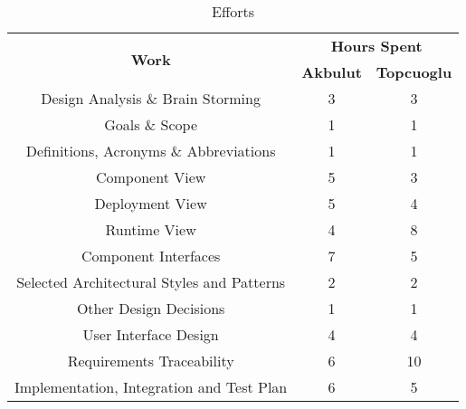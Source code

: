 \begin{table}[ht]
\centering
\begin{tabular}{|c|c|c|}
\hline
\multirow{2}{*}{\textbf{Work}} & \multicolumn{2}{c|}{\textbf{Hours Spent}} \\ \cline{2-3}
                                    & \textbf{Akbulut} & \textbf{Topcuoglu} \\ \hline
Design Analysis \& Brain Storming                                                      & 3          & 3          \\ \hline
Goals \& Scope                                                                          & 1          & 1          \\ \hline
Definitions, Acronyms \& Abbreviations                                                  & 1          & 1          \\ \hline
Component View                                                                              & 5          & 3          \\ \hline
Deployment View                                                                   & 5         & 4         \\ \hline
Runtime View                                                                            & 4          & 8          \\ \hline
Component Interfaces                                                                       & 7          & 5         \\ \hline
Selected Architectural Styles and Patterns                                                                 & 2         & 2          \\ \hline
Other Design Decisions                                                                   & 1          & 1        \\ \hline
User Interface Design                                              & 4          & 4          \\ \hline
Requirements Traceability                                                                & 6          & 10          \\ \hline
Implementation, Integration and Test Plan                                          & 6          & 5         \\ \hline
\end{tabular}
\caption{Efforts}
\end{table}
